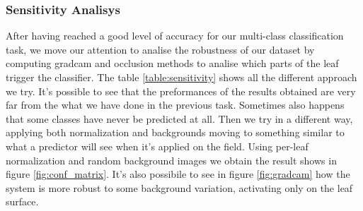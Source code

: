 \subsubsection{Sensitivity Analisys}
After having reached a good level of accuracy for our multi-class classification task, we move our attention to analise the robustness of our dataset by computing gradcam and occlusion methods to analise which parts of the leaf trigger the classifier. The table \ref{table:sensitivity} shows all the different approach we try. It's possible to see that the preformances of the results obtained are very far from the what we have done in the previous task. Sometimes also happens that some classes have never be predicted at all. Then we try in a different way, applying both normalization and backgrounds moving to something similar to what a predictor will see when it's applied on the field. Using per-leaf normalization and random background images we obtain the result shows in figure \ref{fig:conf_matrix}. It's also possibile to see in figure \ref{fig:gradcam} how the system is more robust to some background variation, activating only on the leaf surface.
